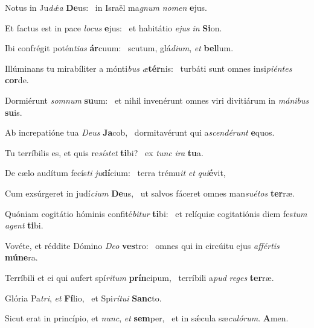 \item Notus in Ju\textit{dǽa} \textbf{De}us:~\psstar{} in Israël ma\textit{gnum} \textit{nomen} \textbf{e}jus.
\item Et factus est in pace \textit{locus} \textbf{e}jus:~\psstar{} et habitátio \textit{ejus} \textit{in} \textbf{Si}on.
\item Ibi confrégit potén\textit{tias} \textbf{ár}cuum:~\psstar{} scutum, glá\textit{dium}, \textit{et} \textbf{bel}lum.
\item Illúminans tu mirabíliter a mónti\textit{bus} \textit{æ}\textbf{tér}nis:~\psstar{} turbáti sunt omnes insi\textit{piéntes} \textbf{cor}de.
\item Dormiérunt \textit{somnum} \textbf{su}um:~\psstar{} et nihil invenérunt omnes viri divitiárum in \textit{mánibus} \textbf{su}is.
\item Ab increpatióne tua \textit{Deus} \textbf{Ja}cob,~\psstar{} dormitavérunt qui a\-\textit{scendérunt} \textbf{e}quos.
\item Tu terríbilis es, et quis re\textit{sístet} \textbf{ti}bi?~\psstar{} ex \textit{tunc} \textit{ira} \textbf{tu}a.
\item De cælo audítum fecís\textit{ti} \textit{ju}\textbf{dí}cium:~\psstar{} terra trému\textit{it} \textit{et} \textit{qui}\textbf{é}vit,
\item Cum exsúrgeret in judí\textit{cium} \textbf{De}us,~\psstar{} ut salvos fáceret omnes man\textit{suétos} \textbf{ter}ræ.
\item Quóniam cogitátio hóminis confité\textit{bitur} \textbf{ti}bi:~\psstar{} et relíquiæ cogitatiónis diem fes\textit{tum} \textit{agent} \textbf{ti}bi.
\item Vovéte, et réddite Dómino \textit{Deo} \textbf{ves}tro:~\psstar{} omnes qui in circúitu ejus \textit{affértis} \textbf{mú}\textbf{ne}ra.
\item Terríbili et ei qui aufert spí\textit{ritum} \textbf{prín}cipum,~\psstar{} terríbili a\textit{pud} \textit{reges} \textbf{ter}ræ.
\item Glória Pa\textit{tri}, \textit{et} \textbf{Fí}lio,~\psstar{} et Spi\textit{rítui} \textbf{Sanc}to.
\item Sicut erat in princípio, et \textit{nunc}, \textit{et} \textbf{sem}per,~\psstar{} et in sǽcula sæ\textit{culórum}. \textbf{A}men.
